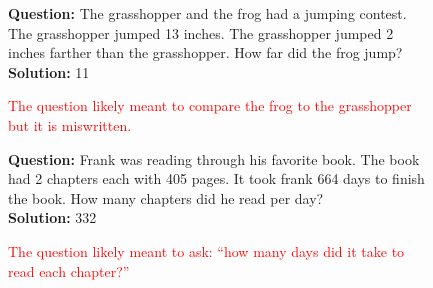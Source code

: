 \begin{figure}[h]
\begin{tcolorbox}[colback=gray!4, colframe=gray!50, arc=2mm, boxrule=0.5pt,left=9pt,right=9pt]
\begin{minipage}{0.48\textwidth}
\begin{tcolorbox}[colback=white, colframe=gray!50, arc=2mm, boxrule=0.5pt, title={Clear flaw / ill-posed, \textit{SVAMP}}, coltitle=black, colbacktitle=gray!10]
\textbf{Question:} The grasshopper and the frog had a jumping contest. The grasshopper jumped 13 inches. The grasshopper jumped 2 inches farther than the grasshopper. How far did the frog jump?\\
\textbf{Solution:} 11
\end{tcolorbox}
\begin{adjustwidth}{1.4em}{0pt} \textcolor{red}{The question likely meant to compare the frog to the grasshopper but it is miswritten.}
\end{adjustwidth}\end{minipage}
\hfill
\begin{minipage}{0.48\textwidth}
    \begin{tcolorbox}[colback=white, colframe=gray!50, arc=2mm, boxrule=0.5pt, title={Clear flaw / ill-posed, \textit{SVAMP}}, coltitle=black, colbacktitle=gray!10]
\textbf{Question:} Frank was reading through his favorite book. The book had 2 chapters each with 405 pages. It took frank 664 days to finish the book. How many chapters did he read per day?\\
\textbf{Solution:} 332
    \end{tcolorbox}
    \begin{adjustwidth}{1.4em}{0pt} \textcolor{red}{The question likely meant to ask: ``how many days did it take to read each chapter?''}
    \end{adjustwidth}
\end{minipage}
\vspace{1em}


\end{tcolorbox}
\end{figure}
